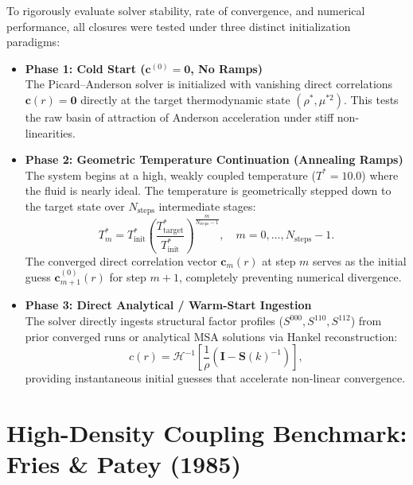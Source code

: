 \documentclass[11pt,a4paper]{article}
\begin{document}
To rigorously evaluate solver stability, rate of convergence, and numerical performance, all closures were tested under three distinct initialization paradigms:

\begin{itemize}
    \item \textbf{Phase 1: Cold Start ($\mathbf{c}^{(0)} = \mathbf{0}$, No Ramps)} \\
    The Picard--Anderson solver is initialized with vanishing direct correlations $\mathbf{c}(r) = \mathbf{0}$ directly at the target thermodynamic state $(\rho^*, \mu^{*2})$. This tests the raw basin of attraction of Anderson acceleration under stiff non-linearities.
    
    \item \textbf{Phase 2: Geometric Temperature Continuation (Annealing Ramps)} \\
    The system begins at a high, weakly coupled temperature ($T^* = 10.0$) where the fluid is nearly ideal. The temperature is geometrically stepped down to the target state over $N_{\text{steps}}$ intermediate stages:
    \begin{equation}
        T_m^* = T_{\text{init}}^* \left(\frac{T_{\text{target}}^*}{T_{\text{init}}^*}\right)^{\frac{m}{N_{\text{steps}}-1}}, \quad m = 0, \dots, N_{\text{steps}}-1.
    \end{equation}
    The converged direct correlation vector $\mathbf{c}_m(r)$ at step $m$ serves as the initial guess $\mathbf{c}_{m+1}^{(0)}(r)$ for step $m+1$, completely preventing numerical divergence.
    
    \item \textbf{Phase 3: Direct Analytical / Warm-Start Ingestion} \\
    The solver directly ingests structural factor profiles ($S^{000}, S^{110}, S^{112}$) from prior converged runs or analytical MSA solutions via Hankel reconstruction:
    \begin{equation}
        c(r) = \mathcal{H}^{-1}\left[ \frac{1}{\rho}\left( \mathbf{I} - \mathbf{S}(k)^{-1} \right) \right],
    \end{equation}
    providing instantaneous initial guesses that accelerate non-linear convergence.
\end{itemize}

\section{High-Density Coupling Benchmark: Fries \& Patey (1985)}
\end{document}
